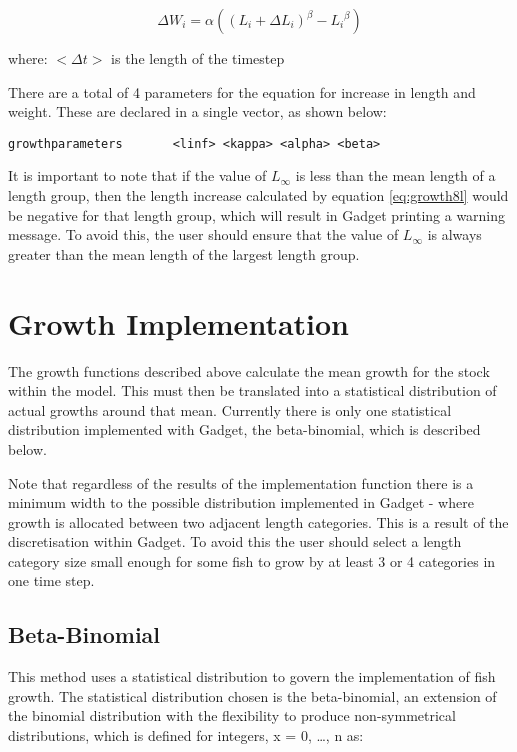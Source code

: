 \documentclass[]{book}
\begin{document}
\begin{equation}
\label{eq:growth8w}
\Delta W_{i} = \alpha \left( \left( L_{i} + \Delta L_{i} \right) ^{\beta} - {L_{i}}^{\beta} \right)\end{equation}

where: \(<\Delta t>\) is the length of the timestep

There are a total of 4 parameters for the equation for increase in
length and weight. These are declared in a single vector, as shown
below:

\begin{verbatim}
growthparameters       <linf> <kappa> <alpha> <beta>
\end{verbatim}

It is important to note that if the value of \(L_{\infty}\) is less than
the mean length of a length group, then the length increase calculated
by equation \eqref{eq:growth8l} would be negative for that length group, which
will result in Gadget printing a warning message. To avoid this, the
user should ensure that the value of \(L_{\infty}\) is always greater than
the mean length of the largest length group.

\hypertarget{sec:stockgrowthimplement}{%
\section{Growth Implementation}\label{sec:stockgrowthimplement}}

The growth functions described above calculate the mean growth for the
stock within the model. This must then be translated into a statistical
distribution of actual growths around that mean. Currently there is only
one statistical distribution implemented with Gadget, the beta-binomial,
which is described below.

Note that regardless of the results of the implementation function there
is a minimum width to the possible distribution implemented in Gadget -
where growth is allocated between two adjacent length categories. This
is a result of the discretisation within Gadget. To avoid this the user
should select a length category size small enough for some fish to grow
by at least 3 or 4 categories in one time step.

\hypertarget{beta-binomial}{%
\subsection{Beta-Binomial}\label{beta-binomial}}

This method uses a statistical distribution to govern the implementation
of fish growth. The statistical distribution chosen is the
beta-binomial, an extension of the binomial distribution with the
flexibility to produce non-symmetrical distributions, which is defined
for integers, x = 0, \ldots{}, n as:
\end{document}
